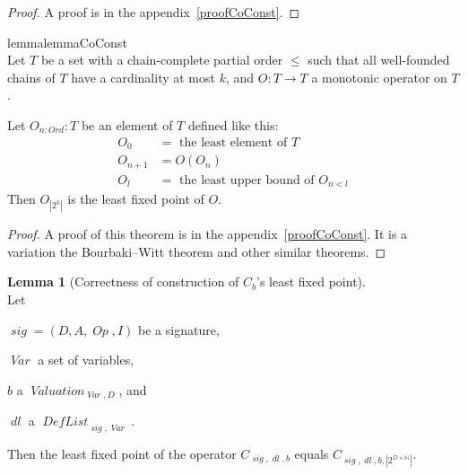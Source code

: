 \documentclass[oneside,12pt]{book}
\theoremstyle{definition}
\newtheorem{lemma}[theorem]{Lemma}
\theoremstyle{remark}
\newcommand\var[1]{\mathop{\mathit{#1}}\nolimits}
\newcommand{\sig}{\var{sig}}
\newcommand{\Op}{\var{Op}}
\newcommand{\Var}{\var{Var}}
\newcommand{\Valuation}{\var{Valuation}}
\newcommand{\DefList}{\var{DefList}}
\newcommand{\dl}{\var{dl}}
\begin{document}
\begin{proof}
  A proof is in the appendix~\ref{proofCoConst}.
\end{proof}

\begin{restatable}%
{lemma}{lemmaCoConst} \label{coConst} \hfill \\
  Let $T$ be a set with a chain-complete partial order $\leq$ such that
  all well-founded chains of $T$ have a cardinality at most $k$,
  and $O\colon T \to T$ a monotonic operator on $T$.
  
  Let $O_{n\colon Ord}\colon T$ be an element of $T$ defined like this:
  \begin{align*}
      O_0 & = \text{ the least element of }T \\
      O_{n+1} & = O(O_n) \\
      O_l & = \text{ the least upper bound of }O_{n<l}
  \end{align*}
  Then $O_{|2^k|}$ is the least fixed point of $O$.
\end{restatable}

\begin{proof}
  A proof of this theorem is in the appendix~\ref{proofCoConst}.
  It is a variation the Bourbaki--Witt theorem and other similar theorems.
\end{proof}

\begin{lemma}[Correctness of construction of $C_b$'s least fixed point]
\label{coConstOpC} \hfill \\
  Let
  \begin{compactitem}
    \item $\sig = (D, A, \Op, I)$ be a signature,
    \item $\Var$ a set of variables,
    \item $b$ a $\Valuation_{\Var,D}$, and
    \item $\dl$ a $\DefList_{\sig,\Var}$.
  \end{compactitem}
  
  \medskip \noindent Then the least fixed point of the operator $C_{\sig,\dl,b}$
  equals $C_{\sig,\dl,b,|2^{D \times \mathbb{N}}|}$.
\end{lemma}
\end{document}
